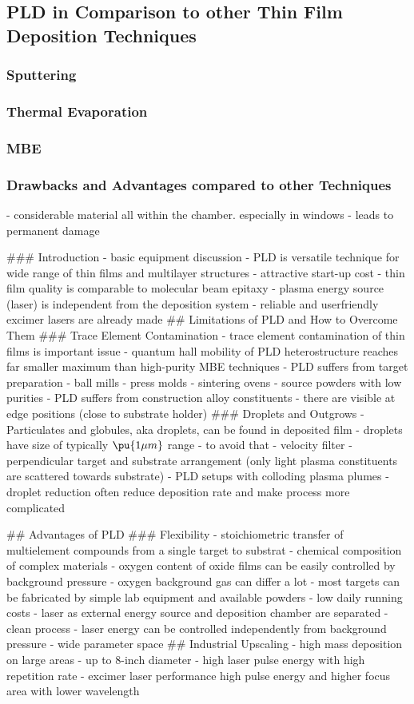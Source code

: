 \subsection{PLD in Comparison to other Thin Film Deposition Techniques}
\subsubsection{Sputtering}
\subsubsection{Thermal Evaporation}
\subsubsection{MBE}

\subsubsection{Drawbacks and Advantages compared to other Techniques}


- considerable material all within the chamber. especially in windows
	- leads to permanent damage


### Introduction
- basic equipment discussion
- PLD is versatile technique for wide range of thin films and multilayer structures
- attractive start-up cost
- thin film quality is comparable to molecular beam epitaxy 
- plasma energy source (laser) is independent from the deposition system
- reliable and userfriendly excimer lasers are already made
## Limitations of PLD and How to Overcome Them
### Trace Element Contamination
- trace element contamination of thin films is important issue
- quantum hall mobility of PLD heterostructure reaches far smaller maximum than high-purity MBE techniques
- PLD suffers from target preparation
	- ball mills
	- press molds
	- sintering ovens
	- source powders with low purities
- PLD suffers from construction alloy constituents
	- there are visible at edge positions (close to substrate holder)
### Droplets and Outgrows
- Particulates and globules, aka droplets, can be found in deposited film
- droplets have size of typically $\pu{ 1\mu m }$ range
- to avoid that
	- velocity filter
	- perpendicular target and substrate arrangement (only light plasma constituents are scattered towards substrate)
	- PLD setups with colloding plasma plumes
- droplet reduction often reduce deposition rate and make process more complicated

## Advantages of PLD
### Flexibility
- stoichiometric transfer of multielement compounds from a single target to substrat
- chemical composition of complex materials 
- oxygen content of oxide films can be easily controlled by background pressure
	- oxygen background gas can differ a lot
- most targets can be fabricated by simple lab equipment and available powders
- low daily running costs 
- laser as external energy source  and deposition chamber are separated
- clean process
- laser energy can be controlled independently from background pressure
- wide parameter space
## Industrial Upscaling
- high mass deposition on large areas
	- up to 8-inch diameter
- high laser pulse energy with high repetition rate
	- excimer laser performance high pulse energy and higher focus area with lower wavelength